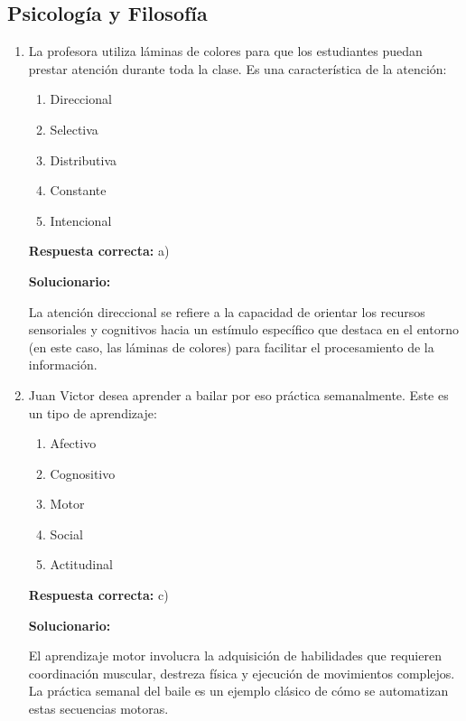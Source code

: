 \subsection*{Psicología y Filosofía}

\begin{enumerate}[resume]
	
	
	\item La profesora utiliza láminas de colores para que los estudiantes puedan prestar atención durante toda la clase. Es una característica de la atención:
	
	\begin{enumerate}[label=\alph*)]
		\item Direccional
		\item Selectiva
		\item Distributiva
		\item Constante
		\item Intencional
	\end{enumerate}
	
	\textbf{Respuesta correcta:} a)
	
	\vspace{2mm}
	\textbf{Solucionario:}
	
	La atención direccional se refiere a la capacidad de orientar los recursos sensoriales y cognitivos hacia un estímulo específico que destaca en el entorno (en este caso, las láminas de colores) para facilitar el procesamiento de la información.
	
	\vspace{6mm}
	
	\item Juan Victor desea aprender a bailar por eso práctica semanalmente. Este es un tipo de aprendizaje:
	
	\begin{enumerate}[label=\alph*)]
		\item Afectivo
		\item Cognositivo
		\item Motor
		\item Social
		\item Actitudinal
	\end{enumerate}
	
	\textbf{Respuesta correcta:} c)
	
	\vspace{2mm}
	\textbf{Solucionario:}
	
	El aprendizaje motor involucra la adquisición de habilidades que requieren coordinación muscular, destreza física y ejecución de movimientos complejos. La práctica semanal del baile es un ejemplo clásico de cómo se automatizan estas secuencias motoras.
	

\end{enumerate}
